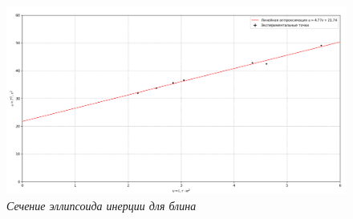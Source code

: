 \documentclass[a4paper, 12pt]{article}
\begin{document}
\begin{figure}[h!]
    \includegraphics[width=1\textwidth]{graph.png}
    \caption{\textit{Сечение эллипсоида инерции для блина}}
    \label{T2I}
\end{figure}
\end{document}
